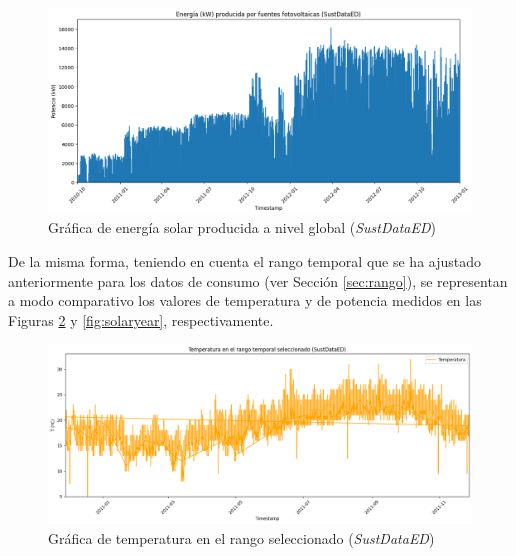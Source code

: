\begin{figure}[h!]
  \centering
  \includegraphics[width=1\textwidth]{img/diseno/matplotsolar.png}
  \caption{Gráfica de energía solar producida a nivel global (\textit{SustDataED})}
  \label{fig:solar}
\end{figure}

\vspace{3mm}

\pagebreak

De la misma forma, teniendo en cuenta el rango temporal que se ha ajustado anteriormente para los datos de consumo (ver Sección \ref{sec:rango}), se representan a modo comparativo los valores de temperatura y de potencia medidos en las Figuras \ref{fig:temp} y \ref{fig:solaryear}, respectivamente. 

\vspace{3mm}

\begin{figure}[H]
  \centering
  \includegraphics[width=1\textwidth]{img/diseno/temp.png}
  \caption{Gráfica de temperatura en el rango seleccionado (\textit{SustDataED})}
  \label{fig:temp}
\end{figure}

